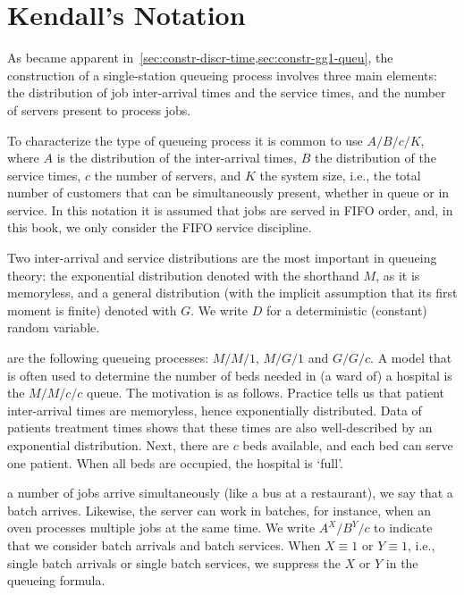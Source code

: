 
\section{Kendall's Notation}
\label{sec:kendalls-notation}

As became apparent in~\cref{sec:constr-discr-time,sec:constr-gg1-queu}, the construction of a single-station queueing process involves three main elements: the distribution of job inter-arrival times and the service times, and the number of servers present to process jobs.



To characterize the type of queueing process it is common to use
 $A/B/c/K$, where $A$ is the distribution of the
inter-arrival times, $B$ the distribution of the service times, $c$ the
number of servers, and $K$ the system size, i.e., the total number of customers that can be simultaneously present, whether in queue or in service.
In this notation it is assumed that jobs are served in FIFO order, and, in this book, we only consider the FIFO service discipline.


Two inter-arrival and service distributions are the most important in queueing theory: the exponential distribution denoted with the shorthand $M$, as it is memoryless, and a general distribution (with the implicit assumption that its first moment is finite) denoted with $G$. We write $D$ for a deterministic (constant) random variable.

 are the following queueing processes: $M/M/1$, $M/G/1$ and $G/G/c$.
A model that is often used to determine the number of beds needed in (a ward of) a hospital is the $M/M/c/c$ queue.
The motivation is as follows.
Practice tells us that patient inter-arrival times are memoryless, hence exponentially distributed.
Data of patients treatment times shows that these times are also well-described by an exponential distribution.
Next, there are $c$ beds available, and each bed can serve one patient. When all beds are occupied, the hospital is `full'.


 a number of jobs arrive simultaneously (like a bus at a restaurant), we say that a batch arrives.
Likewise, the server can work in batches, for instance, when an oven processes multiple jobs at the same time.
We write $A^X/B^Y/c$ to indicate that we consider batch arrivals and batch services.
When $X\equiv 1$ or $Y \equiv 1$, i.e., single batch arrivals or single batch services, we suppress the $X$ or $Y$ in the queueing formula.




